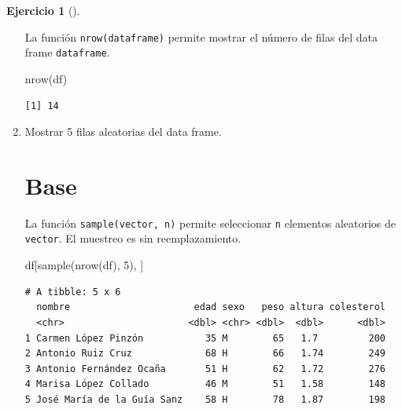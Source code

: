 \documentclass[
  spanish,
  a4paper,
]{scrreport}
\newenvironment{Shaded}{\begin{snugshade}}{\end{snugshade}}
\newcommand{\DecValTok}[1]{\textcolor[rgb]{0.68,0.00,0.00}{#1}}
\newcommand{\FunctionTok}[1]{\textcolor[rgb]{0.28,0.35,0.67}{#1}}
\newcommand{\NormalTok}[1]{\textcolor[rgb]{0.00,0.23,0.31}{#1}}
\theoremstyle{definition}
\newtheorem{exercise}{Ejercicio}[chapter]
\theoremstyle{remark}
\begin{document}
\begin{exercise}[]
\begin{enumerate}
\begin{tcolorbox}
  La función \texttt{nrow(dataframe)} permite mostrar el número de filas
  del data frame \texttt{dataframe}.

\begin{Shaded}
\begin{Highlighting}[]
\FunctionTok{nrow}\NormalTok{(df)}
\end{Highlighting}
\end{Shaded}

\begin{verbatim}
[1] 14
\end{verbatim}

  \end{tcolorbox}
\item
  Mostrar 5 filas aleatorias del data frame.

  \begin{tcolorbox}[enhanced jigsaw, colback=white, opacityback=0, title=\textcolor{quarto-callout-tip-color}{\faLightbulb}\hspace{0.5em}{Solución}, toprule=.15mm, titlerule=0mm, breakable, toptitle=1mm, colframe=quarto-callout-tip-color-frame, coltitle=black, opacitybacktitle=0.6, bottomrule=.15mm, arc=.35mm, colbacktitle=quarto-callout-tip-color!10!white, leftrule=.75mm, bottomtitle=1mm, rightrule=.15mm, left=2mm]

  \section{Base}

  La función \texttt{sample(vector,\ n)} permite seleccionar \texttt{n}
  elementos aleatorios de \texttt{vector}. El muestreo es sin
  reemplazamiento.

\begin{Shaded}
\begin{Highlighting}[]
\NormalTok{df[}\FunctionTok{sample}\NormalTok{(}\FunctionTok{nrow}\NormalTok{(df), }\DecValTok{5}\NormalTok{), ]}
\end{Highlighting}
\end{Shaded}

\begin{verbatim}
# A tibble: 5 x 6
  nombre                      edad sexo   peso altura colesterol
  <chr>                      <dbl> <chr> <dbl>  <dbl>      <dbl>
1 Carmen López Pinzón           35 M        65   1.7         200
2 Antonio Ruiz Cruz             68 H        66   1.74        249
3 Antonio Fernández Ocaña       51 H        62   1.72        276
4 Marisa López Collado          46 M        51   1.58        148
5 José María de la Guía Sanz    58 H        78   1.87        198
\end{verbatim}


\end{tcolorbox}
\end{enumerate}
\end{exercise}
\end{document}

